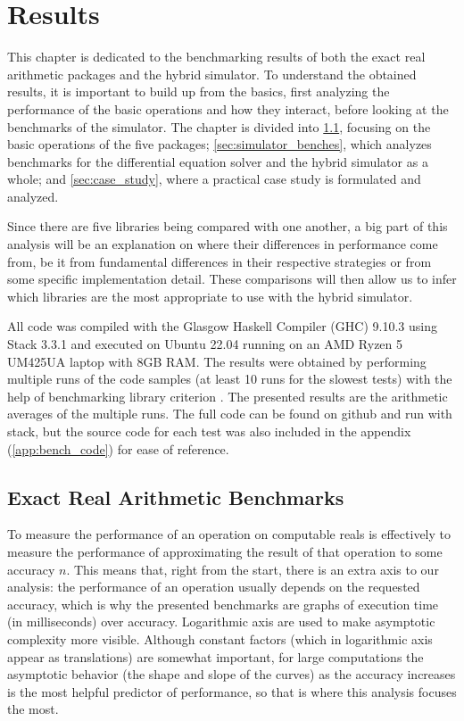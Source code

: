 \chapter{Results}
\label{chap:results}

This chapter is dedicated to the benchmarking results of both the exact real arithmetic packages and the hybrid simulator. To understand the obtained results, it is important to build up from the basics, first analyzing the performance of the basic operations and how they interact, before looking at the benchmarks of the simulator. The chapter is divided into \cref{sec:package_benches}, focusing on the basic operations of the five packages; \cref{sec:simulator_benches}, which analyzes benchmarks for the differential equation solver and the hybrid simulator as a whole; and \cref{sec:case_study}, where a practical case study is formulated and analyzed.

Since there are five libraries being compared with one another, a big part of this analysis will be an explanation on where their differences in performance come from, be it from fundamental differences in their respective strategies or from some specific implementation detail. These comparisons will then allow us to infer which libraries are the most appropriate to use with the hybrid simulator.

All code was compiled with the Glasgow Haskell Compiler (GHC) 9.10.3 using Stack 3.3.1 and executed on Ubuntu 22.04 running on an AMD Ryzen 5 UM425UA laptop with 8GB RAM. The results were obtained by performing multiple runs of the code samples (at least 10 runs for the slowest tests) with the help of benchmarking library criterion \cite{criterion}. The presented results are the arithmetic averages of the multiple runs. The full code can be found on github \cite{Jaguar} and run with stack, but the source code for each test was also included in the appendix (\cref{app:bench_code}) for ease of reference.

\section{Exact Real Arithmetic Benchmarks}
\label{sec:package_benches}

To measure the performance of an operation on computable reals is effectively to measure the performance of approximating the result of that operation to some accuracy $n$. This means that, right from the start, there is an extra axis to our analysis: the performance of an operation usually depends on the requested accuracy, which is why the presented benchmarks are graphs of execution time (in milliseconds) over accuracy. Logarithmic axis are used to make asymptotic complexity more visible. Although constant factors (which in logarithmic axis appear as translations) are somewhat important, for large computations the asymptotic behavior (the shape and slope of the curves) as the accuracy increases is the most helpful predictor of performance, so that is where this analysis focuses the most. 

